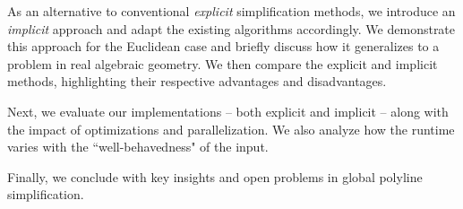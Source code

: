 As an alternative to conventional \emph{explicit} simplification methods, we introduce an \emph{implicit} approach and adapt the existing algorithms accordingly. We demonstrate this approach for the Euclidean case and briefly discuss how it generalizes to a problem in real algebraic geometry. We then compare the explicit and implicit methods, highlighting their respective advantages and disadvantages. 

Next, we evaluate our implementations -- both explicit and implicit -- along with the impact of optimizations and parallelization. We also analyze how the runtime varies with the ``well-behavedness" of the input. 

Finally, we conclude with key insights and open problems in global polyline simplification. 

